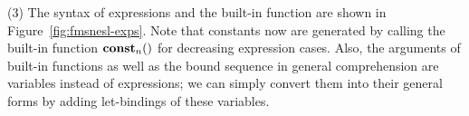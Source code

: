 \noindent (3) The syntax of \fmsnesl expressions and the built-in function are shown in Figure~\ref{fig:fmsnesl-exps}. 
Note that constants now are generated by calling the built-in function $\mathbf{const}_{n}()$ for decreasing expression cases.
Also, the arguments of built-in functions as well as the bound sequence in general comprehension are variables instead of expressions; we can simply convert them into their general forms by adding let-bindings of these variables. 


